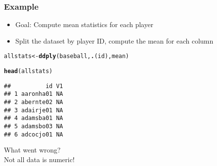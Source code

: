 \documentclass{beamer}\usepackage[]{graphicx}\usepackage[]{color}
\makeatletter
\newcommand{\hlstd}[1]{\textcolor[rgb]{0.345,0.345,0.345}{#1}}%
\newcommand{\hlkwb}[1]{\textcolor[rgb]{0.69,0.353,0.396}{#1}}%
\newcommand{\hlkwd}[1]{\textcolor[rgb]{0.737,0.353,0.396}{\textbf{#1}}}%
\newenvironment{kframe}{%
 \def\at@end@of@kframe{}%
 \ifinner\ifhmode%
  \def\at@end@of@kframe{\end{minipage}}%
  \begin{minipage}{\columnwidth}%
 \fi\fi%
 \def\FrameCommand##1{\hskip\@totalleftmargin \hskip-\fboxsep
 \colorbox{shadecolor}{##1}\hskip-\fboxsep
     \hskip-\linewidth \hskip-\@totalleftmargin \hskip\columnwidth}%
 \MakeFramed {\advance\hsize-\width
   \@totalleftmargin\z@ \linewidth\hsize
   \@setminipage}}%
 {\par\unskip\endMakeFramed%
 \at@end@of@kframe}
\newenvironment{knitrout}{}{} %
\makeatother
\begin{document}
\begin{frame}[fragile]
\frametitle{Example}
\begin{itemize}
\item Goal: Compute mean statistics for each player
\item Split the dataset by player ID, compute the mean for each column
\end{itemize}
\begin{knitrout}\scriptsize
{}\color{fgcolor}\begin{kframe}
\begin{alltt}
\hlstd{allstats} \hlkwb{<-} \hlkwd{ddply}\hlstd{(baseball,} \hlkwd{.}\hlstd{(id), mean)}

\hlkwd{head}\hlstd{(allstats)}
\end{alltt}
\begin{verbatim}
##          id V1
## 1 aaronha01 NA
## 2 abernte02 NA
## 3 adairje01 NA
## 4 adamsba01 NA
## 5 adamsbo03 NA
## 6 adcocjo01 NA
\end{verbatim}
\end{kframe}
\end{knitrout}
{\large What went wrong? \\\hfill Not all data is numeric!}
\end{frame}
\end{document}
